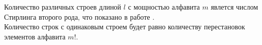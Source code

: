  Количество различных строев длиной $l$ с мощностью алфавита $m$ явлется числом Стирлинга второго рода, что показано в работе 
 \cite{semenov_magistr}.\\

 
 

 Количество строк с одинаковым строем будет равно количеству перестановок элементов алфавита $m!$. \\

 


